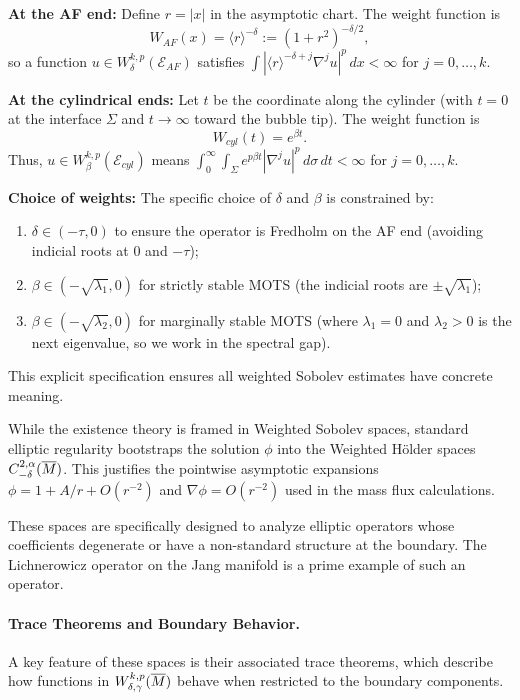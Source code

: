\begin{definition}
\begin{remark}
\textbf{At the AF end:} Define $r = |x|$ in the asymptotic chart. The weight function is
\[
    W_{AF}(x) = \langle r \rangle^{-\delta} := (1 + r^2)^{-\delta/2},
\]
so a function $u \in W^{k,p}_\delta(\mathcal{E}_{AF})$ satisfies $\int |\langle r \rangle^{-\delta + j} \nabla^j u|^p \, dx < \infty$ for $j = 0, \ldots, k$.

\textbf{At the cylindrical ends:} Let $t$ be the coordinate along the cylinder (with $t = 0$ at the interface $\Sigma$ and $t \to \infty$ toward the bubble tip). The weight function is
\[
    W_{cyl}(t) = e^{\beta t}.
\]
Thus, $u \in W^{k,p}_\beta(\mathcal{E}_{cyl})$ means $\int_0^\infty \int_\Sigma e^{p\beta t} |\nabla^j u|^p \, d\sigma \, dt < \infty$ for $j = 0, \ldots, k$.

\textbf{Choice of weights:} The specific choice of $\delta$ and $\beta$ is constrained by:
\begin{enumerate}
    \item $\delta \in (-\tau, 0)$ to ensure the operator is Fredholm on the AF end (avoiding indicial roots at $0$ and $-\tau$);
    \item $\beta \in (-\sqrt{\lambda_1}, 0)$ for strictly stable MOTS (the indicial roots are $\pm\sqrt{\lambda_1}$);
    \item $\beta \in (-\sqrt{\lambda_2}, 0)$ for marginally stable MOTS (where $\lambda_1=0$ and $\lambda_2 > 0$ is the next eigenvalue, so we work in the spectral gap).
\end{enumerate}
This explicit specification ensures all weighted Sobolev estimates have concrete meaning.
\end{remark}

\begin{remark}
While the existence theory is framed in Weighted Sobolev spaces, standard elliptic regularity bootstraps the solution $\phi$ into the Weighted H\"older spaces $C^{2,\alpha}_{-\delta}(\overline{M})$. This justifies the pointwise asymptotic expansions $\phi = 1 + A/r + O(r^{-2})$ and $\nabla \phi = O(r^{-2})$ used in the mass flux calculations.
\end{remark}
\end{definition}

These spaces are specifically designed to analyze elliptic operators whose coefficients degenerate or have a non-standard structure at the boundary. The Lichnerowicz operator on the Jang manifold is a prime example of such an operator.

\paragraph{Trace Theorems and Boundary Behavior.}
A key feature of these spaces is their associated trace theorems, which describe how functions in $W^{k,p}_{\delta, \gamma}(\overline{M})$ behave when restricted to the boundary components.

